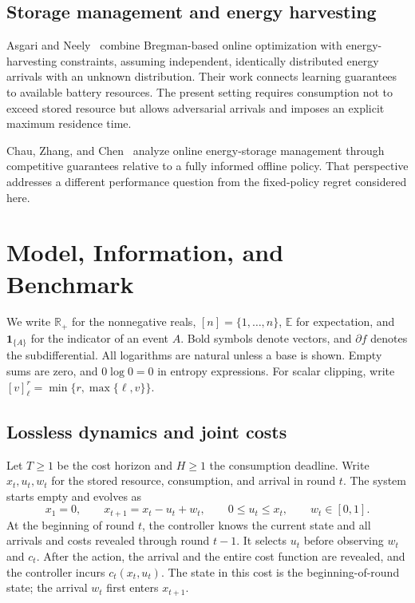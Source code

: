 \documentclass[11pt]{article}
\newcommand{\E}{\mathbb{E}}
\newcommand{\Real}{\mathbb{R}}
\newcommand{\ind}[1]{\mathbf{1}_{\{#1\}}}
\theoremstyle{plain}
\theoremstyle{remark}
\numberwithin{equation}{section}
\begin{document}
\subsection{Storage management and energy harvesting}

Asgari and Neely~\cite{10.1145/3428337} combine Bregman-based online
optimization with energy-harvesting constraints, assuming independent,
identically distributed energy arrivals with an unknown distribution.
Their work connects learning guarantees to available battery resources.
The present setting requires consumption not to exceed stored resource but allows
adversarial arrivals and imposes an explicit maximum residence time.

Chau, Zhang, and Chen~\cite{chau2016cost} analyze online energy-storage
management through competitive guarantees relative to a fully informed
offline policy. That perspective addresses a different performance
question from the fixed-policy regret considered here.

\section{Model, Information, and Benchmark}
\label{ch6:sec:model}

We write $\Real_+$ for the nonnegative reals, $[n]=\{1,\ldots,n\}$,
$\E$ for expectation, and $\ind{A}$ for the indicator of an event $A$.
Bold symbols denote vectors, and $\partial f$ denotes the subdifferential.
All logarithms are natural unless a base is shown. Empty sums are zero,
and $0\log0=0$ in entropy expressions. For scalar clipping, write
$[v]_\ell^r=\min\{r,\max\{\ell,v\}\}$.

\subsection{Lossless dynamics and joint costs}
Let $T\ge1$ be the cost horizon and $H\ge1$ the consumption deadline.
Write $x_t,u_t,w_t$ for the stored resource, consumption, and arrival in
round $t$. The system starts empty and evolves as
\begin{equation}\label{ch6:eq:dynamics}
 x_1=0,\qquad x_{t+1}=x_t-u_t+w_t,\qquad
 0\le u_t\le x_t,\qquad w_t\in[0,1].
\end{equation}
At the beginning of round $t$, the controller knows the current state and
all arrivals and costs revealed through round $t-1$. It selects $u_t$ before
observing $w_t$ and $c_t$. After the action, the arrival and the entire cost
function are revealed, and the controller incurs $c_t(x_t,u_t)$.
The state in this cost is the beginning-of-round state; the arrival $w_t$
first enters $x_{t+1}$.
\end{document}
